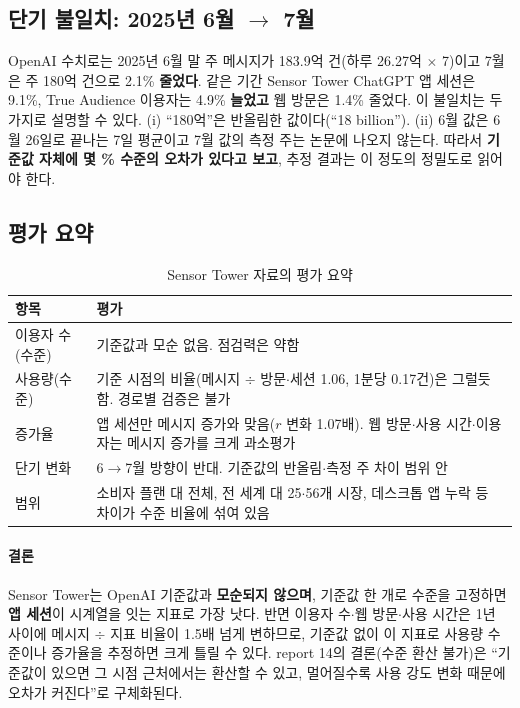 \documentclass[11pt]{article}
\begin{document}
\subsection{단기 불일치: 2025년 6월 $\to$ 7월}\label{sec:shortrun}

OpenAI 수치로는 2025년 6월 말 주 메시지가 183.9억 건(하루 26.27억 $\times$ 7)이고 7월은 주 180억 건으로 2.1\% \textbf{줄었다}. 같은 기간 Sensor Tower ChatGPT 앱 세션은 9.1\%, True Audience 이용자는 4.9\% \textbf{늘었고} 웹 방문은 1.4\% 줄었다. 이 불일치는 두 가지로 설명할 수 있다. (i) ``180억''은 반올림한 값이다(``18 billion''). (ii) 6월 값은 6월 26일로 끝나는 7일 평균이고 7월 값의 측정 주는 논문에 나오지 않는다. 따라서 \textbf{기준값 자체에 몇 \% 수준의 오차가 있다고 보고}, 추정 결과는 이 정도의 정밀도로 읽어야 한다.

\subsection{평가 요약}

\begin{longtable}{L{3.2cm}L{12.6cm}}
\caption{Sensor Tower 자료의 평가 요약}\label{tab:eval}\\
\toprule
항목 & 평가 \\
\midrule
\endhead
이용자 수(수준) & 기준값과 모순 없음. 점검력은 약함 \\
사용량(수준) & 기준 시점의 비율(메시지 $\div$ 방문$\cdot$세션 1.06, 1분당 0.17건)은 그럴듯함. 경로별 검증은 불가 \\
증가율 & 앱 세션만 메시지 증가와 맞음($r$ 변화 1.07배). 웹 방문$\cdot$사용 시간$\cdot$이용자는 메시지 증가를 크게 과소평가 \\
단기 변화 & 6$\to$7월 방향이 반대. 기준값의 반올림$\cdot$측정 주 차이 범위 안 \\
범위 & 소비자 플랜 대 전체, 전 세계 대 25$\cdot$56개 시장, 데스크톱 앱 누락 등 차이가 수준 비율에 섞여 있음 \\
\bottomrule
\end{longtable}

\paragraph{결론} Sensor Tower는 OpenAI 기준값과 \textbf{모순되지 않으며}, 기준값 한 개로 수준을 고정하면 \textbf{앱 세션}이 시계열을 잇는 지표로 가장 낫다. 반면 이용자 수$\cdot$웹 방문$\cdot$사용 시간은 1년 사이에 메시지 $\div$ 지표 비율이 1.5배 넘게 변하므로, 기준값 없이 이 지표로 사용량 수준이나 증가율을 추정하면 크게 틀릴 수 있다. report 14의 결론(수준 환산 불가)은 ``기준값이 있으면 그 시점 근처에서는 환산할 수 있고, 멀어질수록 사용 강도 변화 때문에 오차가 커진다''로 구체화된다.
\end{document}
